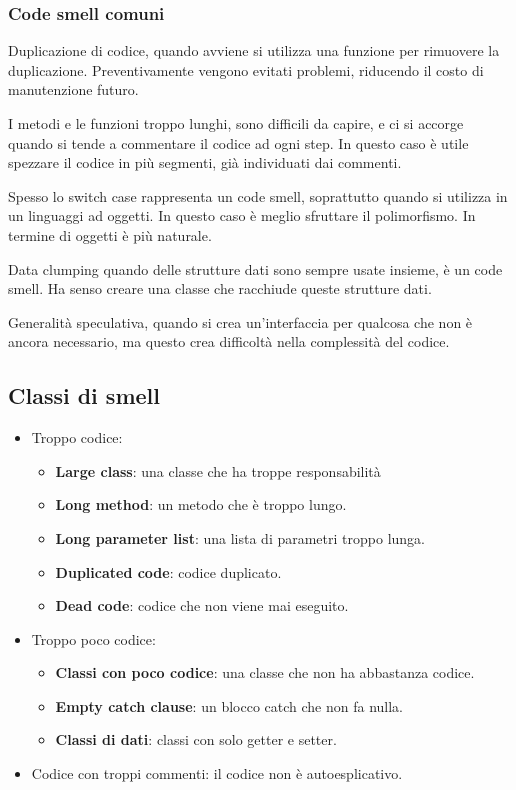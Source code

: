 \subsubsection{Code smell comuni}
Duplicazione di codice, quando avviene si utilizza una funzione
per rimuovere la duplicazione. Preventivamente vengono evitati 
problemi, riducendo il costo di manutenzione futuro.

I metodi e le funzioni troppo lunghi, sono difficili da capire, 
e ci si accorge quando si tende a commentare il codice ad ogni step. In 
questo caso è utile spezzare il codice in più segmenti, già individuati 
dai commenti.

Spesso lo switch case rappresenta un code smell, soprattutto quando
si utilizza in un linguaggi ad oggetti. In questo caso è meglio
sfruttare il polimorfismo.
In termine di oggetti è più naturale.

Data clumping quando delle strutture dati sono sempre usate insieme,
è un code smell. Ha senso creare una classe che racchiude queste
strutture dati.

Generalità speculativa, quando si crea un'interfaccia 
per qualcosa che non è ancora necessario, ma questo crea difficoltà
nella complessità del codice. 

\subsection{Classi di smell}
\begin{itemize}
    \item Troppo codice:
    \begin{itemize}
        \item \textbf{Large class}: una classe che ha troppe responsabilità
        \item \textbf{Long method}: un metodo che è troppo lungo.
        \item \textbf{Long parameter list}: una lista di parametri troppo lunga.
        \item \textbf{Duplicated code}: codice duplicato.
        \item \textbf{Dead code}: codice che non viene mai eseguito.
    \end{itemize}
    \item Troppo poco codice:
    \begin{itemize}
        \item \textbf{Classi con poco codice}: una classe che non ha abbastanza
        codice.
        \item \textbf{Empty catch clause}: un blocco catch che non fa nulla.
        \item \textbf{Classi di dati}: classi con solo getter e setter.
    \end{itemize}
    \item Codice con troppi commenti: il codice non è autoesplicativo.
\end{itemize}
